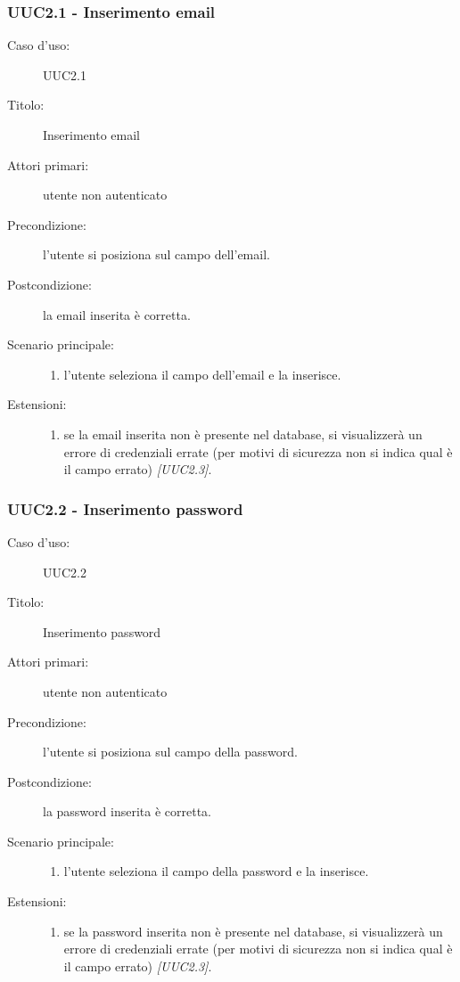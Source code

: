 \documentclass[../../../analisi-dei-requisiti.tex]{subfiles}
\begin{document}
\subsubsection{UUC2.1 - Inserimento email}%
\label{subs:UUC2.1}
\begin{description}
  \item[Caso d’uso:] UUC2.1
  \item[Titolo:] Inserimento email
  \item[Attori primari:] utente non autenticato
  \item[Precondizione:] l'utente si posiziona sul campo dell'email.
  \item[Postcondizione:] la email inserita è corretta.
  \item[Scenario principale:]
  \begin{enumerate}
    \item l'utente seleziona il campo dell'email e la inserisce.
  \end{enumerate}
  \item[Estensioni:]
  \begin{enumerate}
    \item se la email inserita non è presente nel database, si visualizzerà un errore di credenziali errate (per motivi di sicurezza non si indica qual è il campo errato) \emph{[UUC2.3]}.
  \end{enumerate}
\end{description}



\subsubsection{UUC2.2 - Inserimento password}%
\label{subs:UUC2.2}
\begin{description}
  \item[Caso d’uso:] UUC2.2
  \item[Titolo:] Inserimento password
  \item[Attori primari:] utente non autenticato
  \item[Precondizione:] l'utente si posiziona sul campo della password.
  \item[Postcondizione:] la password inserita è corretta.
  \item[Scenario principale:]
  \begin{enumerate}
    \item l'utente seleziona il campo della password e la inserisce.
  \end{enumerate}
  \item[Estensioni:]
  \begin{enumerate}
    \item se la password inserita non è presente nel database, si visualizzerà un errore di credenziali errate (per motivi di sicurezza non si indica qual è il campo errato) \emph{[UUC2.3]}.
  \end{enumerate}
\end{description}
\end{document}
